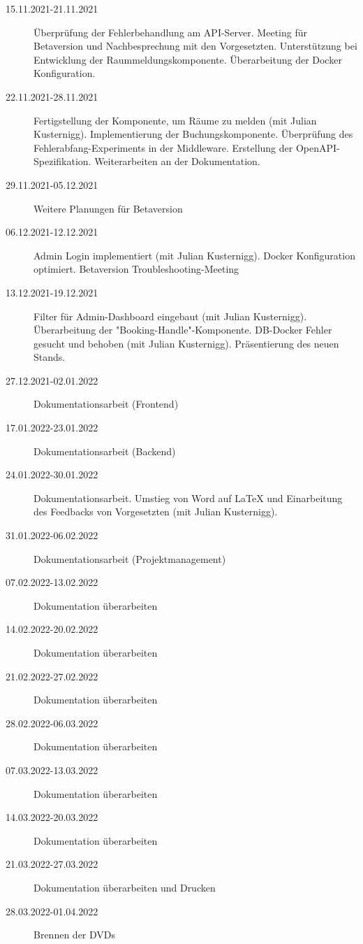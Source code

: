 \begin{description}
    \item[15.11.2021-21.11.2021] Überprüfung der Fehlerbehandlung am API-Server. Meeting für Betaversion und Nachbesprechung mit den Vorgesetzten. Unterstützung bei Entwicklung der Raummeldungskomponente. Überarbeitung der Docker Konfiguration.
    \item[22.11.2021-28.11.2021] Fertigstellung der Komponente, um Räume zu melden (mit Julian Kusternigg). Implementierung der Buchungskomponente. Überprüfung des Fehlerabfang-Experiments in der Middleware.
    Erstellung der OpenAPI-Spezi\-fikation. Weiterarbeiten an der Dokumentation.
    \item[29.11.2021-05.12.2021] Weitere Planungen für Betaversion
    \item[06.12.2021-12.12.2021] Admin Login implementiert (mit Julian Kusternigg). Docker Konfiguration optimiert. Betaversion Troubleshooting-Meeting
    \item[13.12.2021-19.12.2021] Filter für Admin-Dashboard eingebaut (mit Julian Kusternigg). Überarbeitung der "Booking-Handle"-Komponente. DB-Docker Fehler gesucht und behoben (mit Julian Kusternigg). Präsentierung des neuen Stands.
    \item[27.12.2021-02.01.2022] Dokumentationsarbeit (Frontend)
    \item[17.01.2022-23.01.2022] Dokumentationsarbeit (Backend)
    \item[24.01.2022-30.01.2022] Dokumentationsarbeit. Umstieg von Word auf LaTeX und Einarbeitung des Feedbacks von Vorgesetzten (mit Julian Kusternigg). 
    \item[31.01.2022-06.02.2022] Dokumentationsarbeit (Projektmanagement)
    \item[07.02.2022-13.02.2022] Dokumentation überarbeiten
    \item[14.02.2022-20.02.2022] Dokumentation überarbeiten 
    \item[21.02.2022-27.02.2022] Dokumentation überarbeiten
    \item[28.02.2022-06.03.2022] Dokumentation überarbeiten
    \item[07.03.2022-13.03.2022] Dokumentation überarbeiten
    \item[14.03.2022-20.03.2022] Dokumentation überarbeiten
    \item[21.03.2022-27.03.2022] Dokumentation überarbeiten und Drucken
    \item[28.03.2022-01.04.2022] Brennen der DVDs
\end{description}